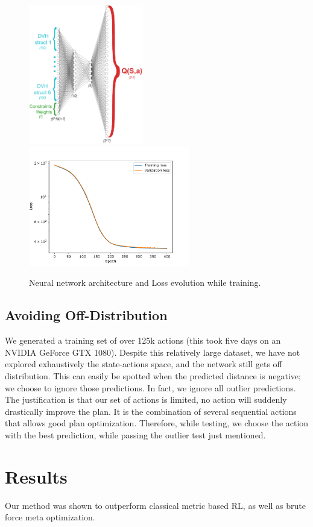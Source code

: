 \begin{figure}
	\centering
	\includegraphics[width=5cm]{architecture_all_actions.pdf}
	\hspace{0.5cm}
	\includegraphics[width=7cm]{losses-distance.pdf}
	\caption{Neural network architecture and Loss evolution while training.}
	\label{fig:architecture}
\end{figure}

\subsection{Avoiding Off-Distribution}
We generated a training set of over 125k actions (this took five days on an NVIDIA GeForce GTX 1080).
Despite this relatively large dataset, we have not explored exhaustively the state-actions space, and the network still gets off distribution.
This can easily be spotted when the predicted distance is negative; we choose to ignore those predictions.
In fact, we ignore all outlier predictions.
The justification is that our set of actions is limited, no action will suddenly drastically improve the plan.
It is the combination of several sequential actions that allows good plan optimization.
Therefore, while testing, we choose the action with the best prediction, while passing the outlier test just mentioned.

\section{Results}
Our method was shown to outperform classical metric based RL, as well as brute force meta optimization.

